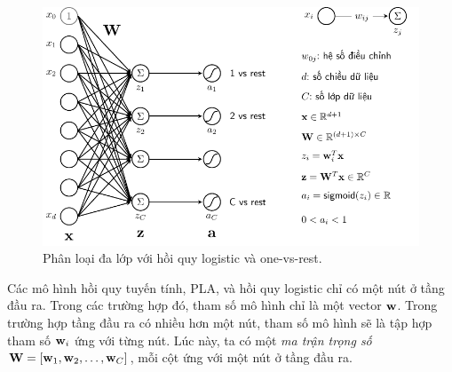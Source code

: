 \begin{figure}[t]
\centering
\includegraphics[width =
.8\textwidth]{Chapters/05_NeuralNetworks/13_softmax/latex/onevsrest.pdf}
\caption[]{Phân loại đa lớp với hồi quy logistic và one-vs-rest.}
\label{fig:13_1}
\end{figure}




Các mô hình hồi quy tuyến tính, PLA, và hồi quy logistic chỉ có một nút ở tầng
đầu ra. Trong các trường hợp đó, tham số mô hình chỉ là một vector $\mathbf{w}$.
Trong trường hợp tầng đầu ra có nhiều hơn một nút, tham số mô hình sẽ là tập hợp
tham số $\mathbf{w}_i$ ứng với từng nút. Lúc này, ta có một \textit{ma trận
trọng số} $\mathbf{W} = [\mathbf{w}_1, \mathbf{w}_2, \dots, \mathbf{w}_C]$, mỗi
cột ứng với một nút ở tầng đầu ra.



